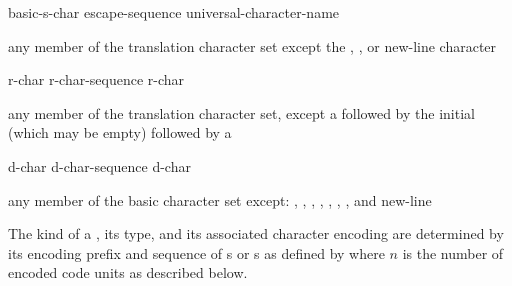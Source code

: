 \begin{bnf}
\br
    basic-s-char\br
    escape-sequence\br
    universal-character-name
\end{bnf}

\begin{bnf}
\br
    \textnormal{any member of the translation character set except the ,}\br
    \bnfindent\textnormal{, or new-line character}
\end{bnf}

\begin{bnf}
\br
      \terminal{(}  \terminal{)}  
\end{bnf}

\begin{bnf}
\br
    r-char\br
    r-char-sequence r-char
\end{bnf}

\begin{bnf}
\br
    \textnormal{any member of the translation character set, except a  followed by}\br
    \bnfindent\textnormal{the initial  (which may be empty) followed by a }
\end{bnf}

\begin{bnf}
\br
    d-char\br
    d-char-sequence d-char
\end{bnf}

\begin{bnf}
\br
    \textnormal{any member of the basic character set except:}\br
    \bnfindent\textnormal{, , , ,}\br
    \bnfindent\textnormal{, , , and new-line}
\end{bnf}

\pnum
{}%
%
%
%
%
%
%
%
%
The kind of a ,
its type, and
its associated character encoding
are determined by its encoding prefix and sequence of
s or s
as defined by 
where $n$ is the number of encoded code units as described below.

